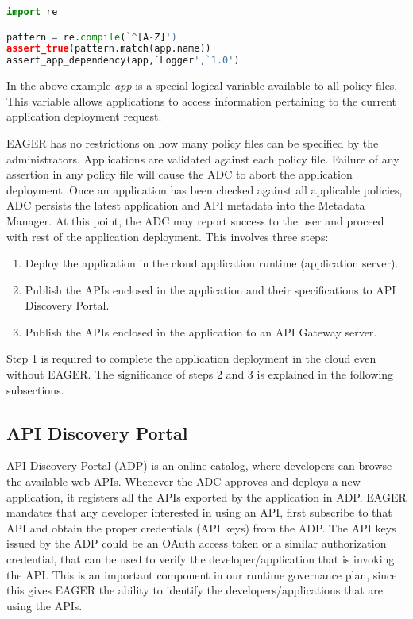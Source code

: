 \begin{lstlisting}[language=Python, frame=single]
import re

pattern = re.compile(`^[A-Z]')
assert_true(pattern.match(app.name))
assert_app_dependency(app,`Logger',`1.0')
\end{lstlisting}

In the above example \textit{app} is a special logical variable available to all policy files. This variable allows applications to access information pertaining
to the current application deployment request. 

EAGER has no restrictions on how many policy files can be specified by the administrators. Applications are validated against each policy file. Failure of 
any assertion in any policy file will cause the ADC to abort the application deployment. Once an application has been checked against all applicable 
policies, ADC persists the latest application and API metadata into the Metadata Manager.
At this point, the ADC may report success to the user and proceed with rest of the application deployment. This involves three steps:

\begin{enumerate}
\item Deploy the application in the cloud application runtime (application server).
\item Publish the APIs enclosed in the application and their specifications to API Discovery Portal.
\item Publish the APIs enclosed in the application to an API Gateway server.
\end{enumerate}

Step 1 is required to complete the application deployment in the cloud even without EAGER. The significance of steps 2 and 3 is explained in the 
following subsections.

\subsection{API Discovery Portal}
API Discovery Portal (ADP) is an online catalog, where developers can browse the available web APIs. Whenever the ADC
approves and deploys a new application, it registers all the APIs exported by the application in ADP. 
EAGER mandates that any developer interested in using an API, first subscribe to that
API and obtain the proper credentials (API keys) from the ADP. The API keys issued by the ADP could be an OAuth access token or a similar authorization
credential, that can be used to verify the developer/application that is invoking the API. This is an important component in our runtime governance
plan, since this gives EAGER the ability to identify the developers/applications that are using the APIs. 

